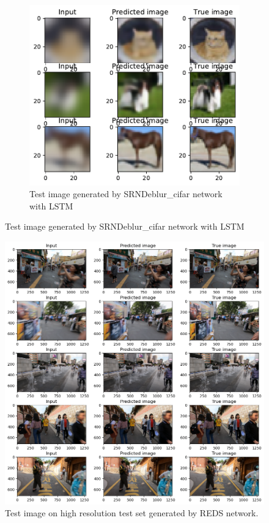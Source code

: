 \begin{figure}[H]
\begin{subfigure}{\textwidth}
        \includegraphics[height=0.48\textheight]{subsections/srndeblur/cifarlstmtest.pdf}
        \caption{Test image generated by SRNDeblur\_cifar network with LSTM }
    \end{subfigure} 
\end{figure}

\begin{figure}[H]
    \centering
    \includegraphics[width=\textwidth,keepaspectratio]{subsections/srndeblur/test.png}
    \caption{Test image on high resolution test set generated by REDS network.}
\end{figure}

